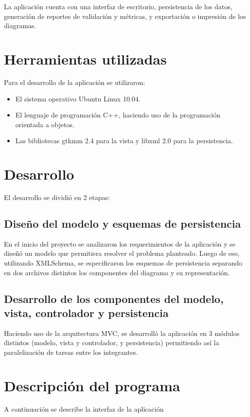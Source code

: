 \documentclass[11pt]{article}
\begin{document}
  La aplicación cuenta con una interfaz de escritorio, persistencia de los datos, generación de reportes de validación y métricas, y exportación 
  o impresión de los diagramas.
   
\section{Herramientas utilizadas}
  Para el desarrollo de la aplicación se utilizaron:
  \begin{itemize}
  \item El sistema operativo Ubuntu Linux 10.04.
  \item El lenguaje de programación  C++, haciendo uso de la programación orientada a objetos.
  \item Las bibliotecas gtkmm 2.4 para la vista y libxml 2.0 para la persistencia.
  \end{itemize}

\section{Desarrollo}
  El desarrollo se dividió en 2 etapas:

  \subsection{Diseño del modelo y esquemas de persistencia}
    En el inicio del proyecto se analizaron los requerimientos de la aplicación y se diseñó un modelo que permitiera resolver el problema planteado.
    Luego de eso, utilizando XMLSchema, se especificaron los esquemas de persistencia separando en dos archivos distintos los componentes del diagrama
    y su representación.
  
  \subsection{Desarrollo de los componentes del modelo, vista, controlador y persistencia}
    Haciendo uso de la arquitectura MVC, se desarrolló la aplicación en 3 módulos distintos (modelo, vista y controlador, y persistencia)
    permitiendo así la paralelización de tareas entre los integrantes.
  
\section{Descripción del programa}

  A continuación se describe la interfaz de la aplicación
  
\end{document}

